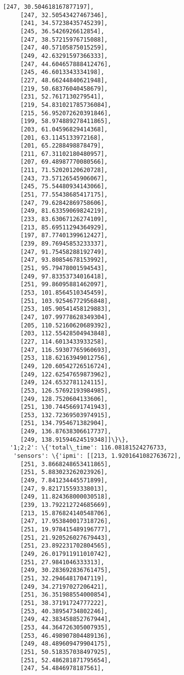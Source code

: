 \documentclass[11pt]{article}
\begin{document}
\begin{tcolorbox}[breakable, size=fbox, boxrule=.5pt, pad at break*=1mm, opacityfill=0]
\begin{Verbatim}[commandchars=\\\{\}]
     [247, 30.504618167877197],
     [247, 32.50543427467346],
     [241, 34.57238435745239],
     [245, 36.5426926612854],
     [247, 38.57215976715088],
     [247, 40.57105875015259],
     [249, 42.63291597366333],
     [247, 44.604657888412476],
     [245, 46.6013343334198],
     [227, 48.66244840621948],
     [219, 50.68376040458679],
     [231, 52.7617130279541],
     [219, 54.831021785736084],
     [215, 56.952072620391846],
     [199, 58.974889278411865],
     [203, 61.04596829414368],
     [201, 63.1145133972168],
     [201, 65.2288498878479],
     [211, 67.31102180480957],
     [207, 69.48987770080566],
     [211, 71.52020120620728],
     [243, 73.57126545906067],
     [245, 75.54480934143066],
     [251, 77.55438685417175],
     [247, 79.62842869758606],
     [249, 81.63359069824219],
     [233, 83.63067126274109],
     [213, 85.69511294364929],
     [197, 87.77401399612427],
     [239, 89.76945853233337],
     [247, 91.75458288192749],
     [247, 93.80854678153992],
     [251, 95.79478001594543],
     [249, 97.83353734016418],
     [251, 99.86095881462097],
     [253, 101.8564510345459],
     [251, 103.92546772956848],
     [253, 105.90541458129883],
     [247, 107.99778628349304],
     [205, 110.52160620689392],
     [203, 112.55428504943848],
     [227, 114.6013433933258],
     [247, 116.59307765960693],
     [253, 118.62163949012756],
     [249, 120.60542726516724],
     [249, 122.62547659873962],
     [249, 124.6532781124115],
     [253, 126.57692193984985],
     [249, 128.7520604133606],
     [251, 130.74456691741943],
     [253, 132.72369503974915],
     [251, 134.7954671382904],
     [249, 136.87638306617737],
     [249, 138.91594624519348]]\}\},
  '1;2;2': \{'total\_time': 116.08181524276733,
   'sensors': \{'ipmi': [[213, 1.9201641082763672],
     [251, 3.8668248653411865],
     [251, 5.883023262023926],
     [249, 7.841234445571899],
     [247, 9.821715593338013],
     [249, 11.824368000030518],
     [239, 13.792212724685669],
     [213, 15.876824140548706],
     [247, 17.953840017318726],
     [251, 19.978415489196777],
     [251, 21.920526027679443],
     [251, 23.892231702804565],
     [249, 26.017911911010742],
     [251, 27.9841046333313],
     [249, 30.283692836761475],
     [251, 32.29464817047119],
     [249, 34.27197027206421],
     [251, 36.351988554000854],
     [251, 38.37191724777222],
     [253, 40.38954734802246],
     [249, 42.383458852767944],
     [253, 44.364726305007935],
     [253, 46.498907804489136],
     [249, 48.489609479904175],
     [251, 50.518357038497925],
     [251, 52.486281871795654],
     [247, 54.4846978187561],

\end{Verbatim}
\end{tcolorbox}
\end{document}
